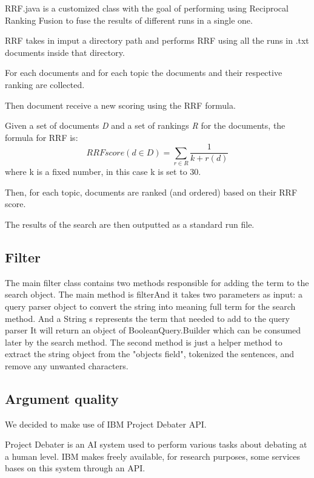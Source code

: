         RRF.java is a customized class with the goal of performing using Reciprocal Ranking Fusion to fuse the results of different runs in a single one.
        
        RRF takes in imput a directory path and performs RRF using all the runs in .txt documents inside that directory.
        
        For each documents and for each topic the documents and their respective ranking are collected.
        
        Then document receive a new scoring using the RRF formula.
        
        Given a set of documents \textit{D} and a set of rankings \textit{R} for the documents, the formula for RRF is:
        $$RRFscore(d \in D)=\sum_{r \in R}^{}\frac{1}{k+r(d)}$$
        where k is a fixed number, in this case k is set to 30.
        
        Then, for each topic, documents are ranked (and ordered) based on their RRF score.
        
        The results of the search are then outputted as a standard run file.
\subsection{Filter}
 
    The main filter class contains two methods responsible for adding the term to the search object. The main method is filterAnd it takes two parameters as input: a query parser object to convert the string into meaning full term for the search method. And a String s represents the term that needed to add to the query parser It will return an object of BooleanQuery.Builder which can be consumed later by the search method. The second method is just a helper method to extract the string object from the "objects field", tokenized the sentences, and remove any unwanted characters.

\subsection{Argument quality}
  
  We decided to make use of IBM Project Debater API.
  
      Project Debater is an AI system used to perform various tasks about debating at a human level. IBM makes freely available, for research purposes, some services bases on this system through an API. \citep{ProjectDebaterAPI}
      
